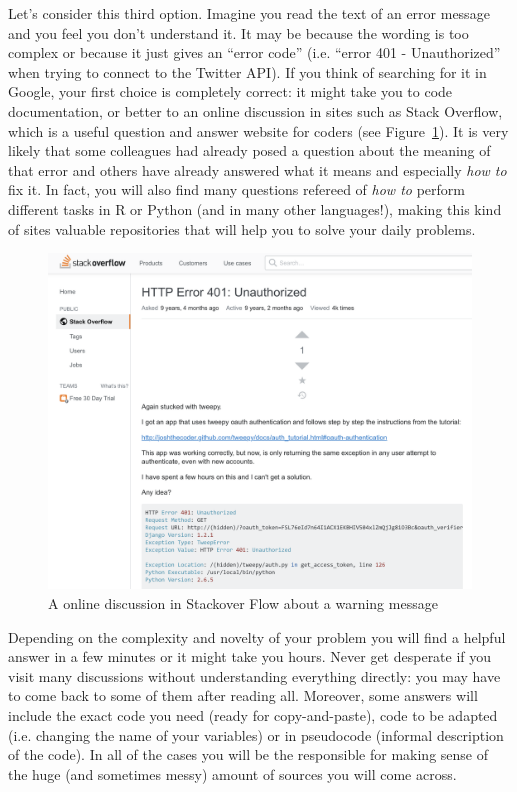 Let's consider this third option. Imagine you read the text of an error message and you feel you don't understand it. It may be because the wording is too complex or because it just gives an ``error code'' (i.e. ``error 401 - Unauthorized'' when trying to connect to the Twitter API). If you think of searching for it in Google, your first choice is completely correct: it might take you to code documentation, or better to an online discussion in sites such as Stack Overflow, which is a useful question and answer website for coders (see Figure~\ref{fig:stackover}). It is very likely that some colleagues had already posed a question about the meaning of that error and others have already answered what it means and especially \textit{how to} fix it. In fact, you will also find many questions refereed of \textit{how to} perform different tasks in R or Python (and in many other languages!),  making this kind of sites valuable repositories that will help you to solve your daily problems.

\begin{figure}
\centering
\includegraphics[width=0.9\linewidth]{figures/ch4_stackover}
\caption{A online discussion in Stackover Flow about a warning message }
\label{fig:stackover}
\end{figure}

Depending on the complexity and novelty of your problem you will find a helpful answer in a few minutes or it might take you hours. Never get desperate if you visit many discussions without understanding everything directly: you may have to come back to some of them after reading all. Moreover, some answers will include the exact code you need (ready for copy-and-paste), code to be adapted (i.e. changing the name of your variables) or in pseudocode (informal description of the code). In all of the cases you will be the responsible for making sense of the huge (and sometimes messy) amount of sources you will come across. 

